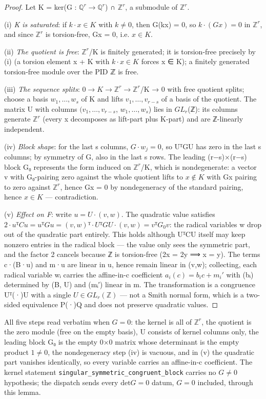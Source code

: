 \begin{proof}
Let K = ker(G : $ℚ^{r} → ℚ^{r}$) ∩ $ℤ^{r}$, a submodule of $ℤ^{r}$.

(i) \emph{K is saturated}: if $k·x ∈ K$ with $k ≠ 0$, then G(kx) = 0, so $k·(Gx) = 0$ in $ℤ^{r}$, and since $ℤ^{r}$ is torsion-free, Gx = 0, i.e. $x ∈ K$.

(ii) \emph{The quotient is free}: $ℤ^{r}$/K is finitely generated; it is torsion-free precisely by (i) (a torsion element x + K with $k·x ∈ K$ forces x ∈ K); a finitely generated torsion-free module over the PID ℤ is free.

(iii) \emph{The sequence splits}: $0 → K → ℤ^{r} → ℤ^{r}$/K → 0 with free quotient splits; choose a basis $w_{1},…,w_{s}$ of K and lifts $v_{1},…,v_{r−s}$ of a basis of the quotient. The matrix U with columns $(v_{1},…,v_{r−s}$, $w_{1},…,w_{s}$) lies in $GL_{r}$(ℤ): its columns generate $ℤ^{r}$ (every x decomposes as lift-part plus K-part) and are ℤ-linearly independent.

(iv) \emph{Block shape}: for the last s columns, $G·w_{j} = 0$, so UᵀGU has zero in the last s columns; by symmetry of G, also in the last s rows. The leading (r−s)×(r−s) block G₀ represents the form induced on $ℤ^{r}$/K, which is nondegenerate: a vector v with G₀-pairing zero against the whole quotient lifts to $x ∉ K$ with Gx pairing to zero against $ℤ^{r}$, hence Gx = 0 by nondegeneracy of the standard pairing, hence $x ∈ K$ — contradiction.

(v) \emph{Effect on F}: write $u = U·(v, w)$. The quadratic value satisfies $2·uᵀCu = uᵀGu = (v,w)ᵀ·UᵀGU·(v,w) = vᵀG_{0}v$: the radical variables w drop out of the quadratic part entirely. This holds although UᵀCU itself may keep nonzero entries in the radical block — the value only sees the symmetric part, and the factor 2 cancels because ℤ is torsion-free (2x = 2y ⟹ x = y). The terms c·(B·u) and m·u are linear in u, hence remain linear in (v,w); collecting, each radical variable wᵢ carries the affine-in-c coefficient $a_{i}(c) = b_{i} c + m_{i}′$ with (bᵢ) determined by (B, U) and (mᵢ′) linear in m. The transformation is a congruence Uᵀ(·)U with a single $U ∈ GL_{r}(ℤ)$ — not a Smith normal form, which is a two-sided equivalence P(·)Q and does not preserve quadratic values.

\end{proof}
All five steps read verbatim when $G = 0$: the kernel is all of $ℤ^{r}$, the quotient is the zero module (free on the empty basis), U consists of kernel columns only, the leading block G₀ is the empty 0×0 matrix whose determinant is the empty product $1 ≠ 0$, the nondegeneracy step (iv) is vacuous, and in (v) the quadratic part vanishes identically, so every variable carries an affine-in-c coefficient. The kernel statement \texttt{singular\_\allowbreak{}symmetric\_\allowbreak{}congruent\_\allowbreak{}block} carries no $G ≠ 0$ hypothesis; the dispatch sends every $\mathrm{det} G = 0$ datum, $G = 0$ included, through this lemma.

